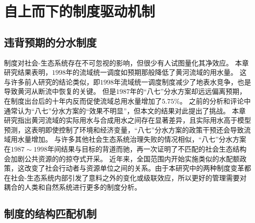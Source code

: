 \section{自上而下的制度驱动机制}

\subsection{违背预期的分水制度}

制度对社会-生态系统存在不可忽视的影响，但很少有人试图量化其净效应\cite{cumming2020a}。
本章研究结果表明，$1998$年的流域统一调度如预期那般降低了黄河流域的用水量。
这与许多前人研究的结论类似，即$1998$年流域统一调度制度减少了地表水竞争，也是导致黄河从断流中恢复的关键\cite{chen2021,huangang2002,an2007}。
但是$1987$年的“八七”分水方案却远远偏离预期，在制度出台后的十年内反而促使流域总用水量增加了$5.75\%$。
之前的分析和评论中通常认为“八七”分水方案的“效果不明显”，但本文的结果对此提出了挑战。
本章研究指出黄河流域的实际用水与合成用水之间存在显著差异，且实际用水高于模型预测\cite{abadie2015,hill2021}，这表明即使控制了环境和经济变量，“八七”分水方案的政策干预还会导致流域用水量增加。
与许多其他社会生态系统治理失败的情况相似，“八七”分水方案在$1987 \sim 1998$年间结果与目标的背道而驰，再一次证明了不匹配的社会生态结构会加剧公共资源的的掠夺式开采\cite{kellenberg2009,cai2016,barnes2019}。
近年来，全国范围内开始实施类似的水配额政策，这改变了社会行动者与资源单位之间的关系。由于本研究中的两种制度变革都在社会-生态系统内部引发了意料之外的变化或级联效应，所以更好的管理需要对耦合的人类和自然系统进行更多的制度分析。

%
\subsection{制度的结构匹配机制}


